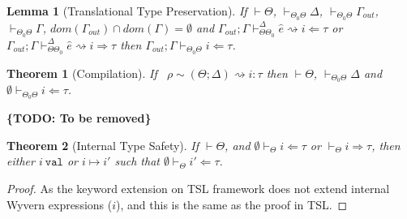 \documentclass[letterpaper, notitlepage]{article}
\newcommand{\todo}[1]{{\bf \{TODO: {#1}\}}}
\newtheorem{theorem}{Theorem}
\newtheorem{lemma}{Lemma}
\begin{document}
\begin{lemma}[Translational Type Preservation]
If $\vdash\Theta$, $\vdash_{\Theta_0\Theta} \Delta$, $\vdash_{\Theta_0\Theta}\Gamma_{out}$, $\vdash_{\Theta_0\Theta}\Gamma$, $dom(\Gamma_{out})\cap dom(\Gamma)=\emptyset$ and $\Gamma_{out};\Gamma\vdash_{\Theta\Theta_0}^{\Delta}\hat{e}\rightsquigarrow i\Leftarrow\tau$ or $\Gamma_{out};\Gamma\vdash_{\Theta\Theta_0}^{\Delta}\hat{e}\rightsquigarrow i\Rightarrow \tau$ then $\Gamma_{out};\Gamma\vdash_{\Theta_0\Theta}i\Leftarrow \tau$.
\end{lemma}

\begin{theorem}[Compilation]
If ~$\rho\sim(\Theta;\Delta)\rightsquigarrow i:\tau$ then $\vdash\Theta$, $\vdash_{\Theta_0\Theta}\Delta$ and $\emptyset\vdash_{\Theta_0\Theta} i\Leftarrow\tau$.
\end{theorem}



\todo{To be removed}
\begin{theorem}[Internal Type Safety]
If $\vdash\Theta$, and $\emptyset\vdash_{\Theta}i\Leftarrow\tau$ or $\vdash_{\Theta}i\Rightarrow\tau$, then either $i~\texttt{val}$ or $i\mapsto i'$ such that $\emptyset\vdash_{\Theta}i'\Leftarrow\tau$.
\end{theorem}
\begin{proof}
As the keyword extension on TSL framework does not extend internal Wyvern expressions ($i$), and this is the same as the proof in TSL. 
\end{proof}
\end{document}
